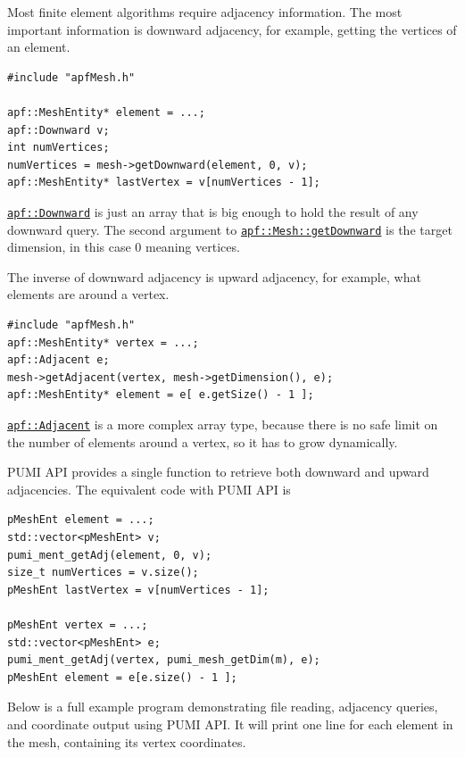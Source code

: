 \documentclass{article}
\begin{document}
{Most finite element algorithms require adjacency information.
The most important information is downward adjacency, for
example, getting the vertices of an element.

\begin{lstlisting}
#include "apfMesh.h"

apf::MeshEntity* element = ...;
apf::Downward v;
int numVertices;
numVertices = mesh->getDownward(element, 0, v);
apf::MeshEntity* lastVertex = v[numVertices - 1];
\end{lstlisting}

\href{http://scorec.rpi.edu/~dibanez/core/namespaceapf.html#a041eedcdfef4c64dafb2936219978328}{\texttt{apf::Downward}}
is just an array that is big enough to hold the result of any downward
query.
The second argument to
\href{http://scorec.rpi.edu/~dibanez/core/classapf_1_1Mesh.html#ae9af2075129ffd4553092049d85b276b}{\texttt{apf::Mesh::getDownward}}
is the target dimension, in this case 0 meaning vertices.

The inverse of downward adjacency is upward adjacency,
for example, what elements are around a vertex.

\begin{lstlisting}
#include "apfMesh.h"
apf::MeshEntity* vertex = ...;
apf::Adjacent e;
mesh->getAdjacent(vertex, mesh->getDimension(), e);
apf::MeshEntity* element = e[ e.getSize() - 1 ];
\end{lstlisting}

\href{http://scorec.rpi.edu/~dibanez/core/namespaceapf.html#a12d882b4789bf98322cbe6f02c91b1f8}{\texttt{apf::Adjacent}} is a more complex array type,
because there is no safe limit on the number of elements around
a vertex, so it has to grow dynamically.

PUMI API provides a single function to retrieve both downward and upward adjacencies.
The equivalent code with PUMI API is

\begin{lstlisting}
pMeshEnt element = ...;
std::vector<pMeshEnt> v;
pumi_ment_getAdj(element, 0, v);
size_t numVertices = v.size();
pMeshEnt lastVertex = v[numVertices - 1];

pMeshEnt vertex = ...;
std::vector<pMeshEnt> e;
pumi_ment_getAdj(vertex, pumi_mesh_getDim(m), e);
pMeshEnt element = e[e.size() - 1 ];
\end{lstlisting}

Below is a full example program demonstrating file reading,
adjacency queries, and coordinate output using PUMI API.
It will print one line for each element in the mesh,
containing its vertex coordinates.

}
\end{document}
